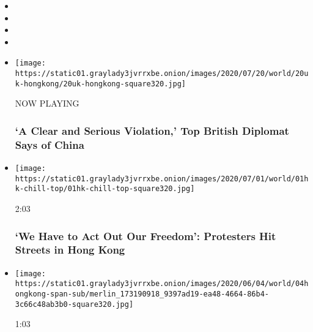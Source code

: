 \begin{itemize}
\item
\item
\item
\item
\end{itemize}

\begin{itemize}
\item
  \texttt{[image: https://static01.graylady3jvrrxbe.onion/images/2020/07/20/world/20uk-hongkong/20uk-hongkong-square320.jpg]}

  NOW PLAYING

  \hypertarget{a-clear-and-serious-violation-top-british-diplomat-says-of-china-2}{%
  \subsubsection{`A Clear and Serious Violation,' Top British Diplomat
  Says of
  China}\label{a-clear-and-serious-violation-top-british-diplomat-says-of-china-2}}
\item
  \href{https://www.nytimes3xbfgragh.onion/video/world/100000007218668/hong-kong-protests-china.html?action=click\&module=video-series-bar\&region=header\&pgtype=Article\&playlistId=video/hk-protest}{}

  \texttt{[image: https://static01.graylady3jvrrxbe.onion/images/2020/07/01/world/01hk-chill-top/01hk-chill-top-square320.jpg]}

  2:03

  \hypertarget{we-have-to-act-out-our-freedom-protesters-hit-streets-in-hong-kong}{%
  \subsubsection{`We Have to Act Out Our Freedom': Protesters Hit
  Streets in Hong
  Kong}\label{we-have-to-act-out-our-freedom-protesters-hit-streets-in-hong-kong}}
\item
  \href{https://www.nytimes3xbfgragh.onion/video/world/asia/100000007174092/hong-kong-china-tiananmen-vigil.html?action=click\&module=video-series-bar\&region=header\&pgtype=Article\&playlistId=video/hk-protest}{}

  \texttt{[image: https://static01.graylady3jvrrxbe.onion/images/2020/06/04/world/04hongkong-span-sub/merlin\_173190918\_9397ad19-ea48-4664-86b4-3c66c48ab3b0-square320.jpg]}

  1:03

  \hypertarget{thousands-in-hong-kong-defy-ban-to-attend-tiananmen-vigil}{%
}
\end{itemize}
